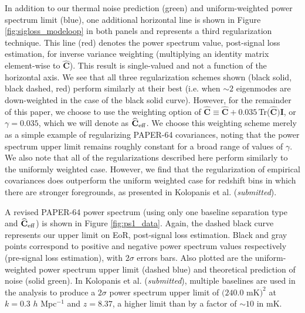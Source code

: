 \documentclass[preprint2,numberedappendix,tighten]{aastex6}
\begin{document}
In addition to our thermal noise prediction (green) and uniform-weighted power spectrum limit (blue), one additional horizontal line is shown in Figure \ref{fig:sigloss_modeloop} 
in both panels and represents a third regularization technique. This line (red) denotes the power spectrum value, post-signal loss estimation, for inverse variance weighting (multiplying an identity 
matrix element-wise to $\widehat{\textbf{C}}$). This result is single-valued and not a function of the horizontal axis. We see that all three regularization schemes shown (black solid, black dashed, red) perform similarly at 
their best (i.e. when $\sim2$ eigenmodes are down-weighted in the case of the black solid curve). However, for the remainder of this paper, we choose to use the weighting option of $\widehat{\textbf{C}} \equiv \widehat{\textbf{C}} + 0.035 \,$Tr($\widehat{\textbf{C}})\textbf{I}$, or $\gamma = 0.035$, which we will denote as $\widehat{\textbf{C}}_{\rm eff}$. We choose this weighting scheme merely as a simple example of regularizing PAPER-64 covariances, noting that the power spectrum upper limit remains roughly constant for a broad range of values of $\gamma$. We also note that all of the regularizations described here perform similarly to the uniformly weighted case. However, we find that the regularization of empirical covariances does outperform the uniform weighted case for redshift bins in which there are stronger foregrounds, as presented in Kolopanis et al. (\textit{submitted}).

A revised PAPER-64 power spectrum (using only one baseline separation type and $\widehat{\textbf{C}}_{\rm eff}$) is shown in Figure 
\ref{fig:ps1_data}. Again, the dashed black curve represents our upper limit on EoR, post-signal loss estimation. Black and gray points correspond to positive and negative power spectrum values respectively (pre-signal loss estimation), with 
$2\sigma$ errors bars. Also plotted are the uniform-weighted power spectrum upper limit (dashed blue) and theoretical prediction of 
noise (solid green). In Kolopanis et al. (\textit{submitted}), multiple baselines are used in the analysis to produce a $2\sigma$ power spectrum upper limit of $(240.0$ mK$)^{2}$ at $k=0.3$ $h$ Mpc$^{-1}$ and $z=8.37$, 
a higher limit than  by a factor of $\sim$$10$ in mK.
\end{document}
